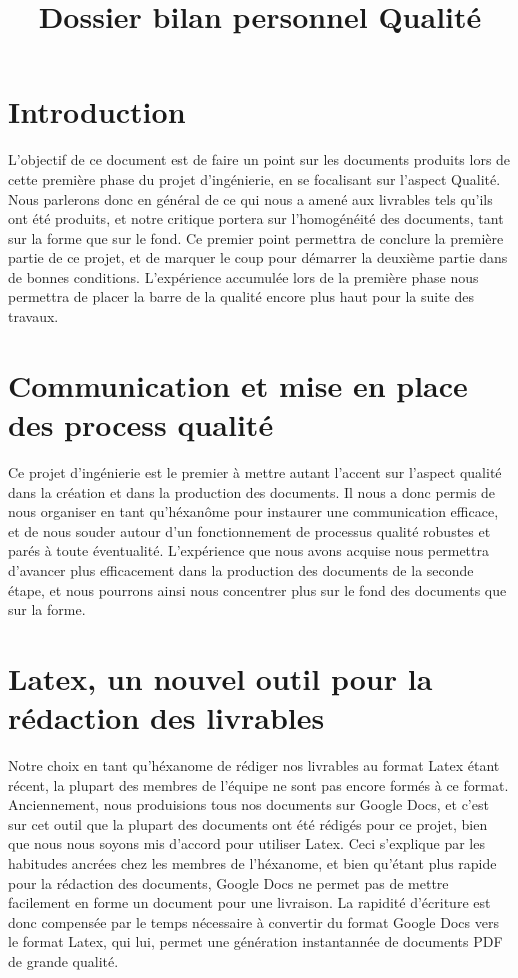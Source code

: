 \documentclass[a4paper]{article}
\begin{document}
\title{Dossier bilan personnel Qualité}
\maketitle

\section{Introduction}

L'objectif de ce document est de faire un point sur les documents produits lors de cette première phase du projet d'ingénierie, en se focalisant sur l'aspect Qualité. Nous parlerons donc en général de ce qui nous a amené aux livrables tels qu'ils ont été produits, et notre critique portera sur l'homogénéité des documents, tant sur la forme que sur le fond. Ce premier point permettra de conclure la première partie de ce projet, et de marquer le coup pour démarrer la deuxième partie dans de bonnes conditions. L'expérience accumulée lors de la première phase nous permettra de placer la barre de la qualité encore plus haut pour la suite des travaux.

\section{Communication et mise en place des process qualité}

Ce projet d'ingénierie est le premier à mettre autant l'accent sur l'aspect qualité dans la création et dans la production des documents. Il nous a donc permis de nous organiser en tant qu'héxanôme pour instaurer une communication efficace, et de nous souder autour d'un fonctionnement de processus qualité robustes et parés à toute éventualité. L'expérience que nous avons acquise nous permettra d'avancer plus efficacement dans la production des documents de la seconde étape, et nous pourrons ainsi nous concentrer plus sur le fond des documents que sur la forme.

\section{Latex, un nouvel outil pour la rédaction des livrables}

Notre choix en tant qu'héxanome de rédiger nos livrables au format Latex étant récent, la plupart des membres de l'équipe ne sont pas encore formés à ce format. Anciennement, nous produisions tous nos documents sur Google Docs, et c'est sur cet outil que la plupart des documents ont été rédigés pour ce projet, bien que nous nous soyons mis d'accord pour utiliser Latex. Ceci s'explique par les habitudes ancrées chez les membres de l'héxanome, et bien qu'étant plus rapide pour la rédaction des documents, Google Docs ne permet pas de mettre facilement en forme un document pour une livraison. La rapidité d'écriture est donc compensée par le temps nécessaire à convertir du format Google Docs vers le format Latex, qui lui, permet une génération instantannée de documents PDF de grande qualité.
\end{document}
